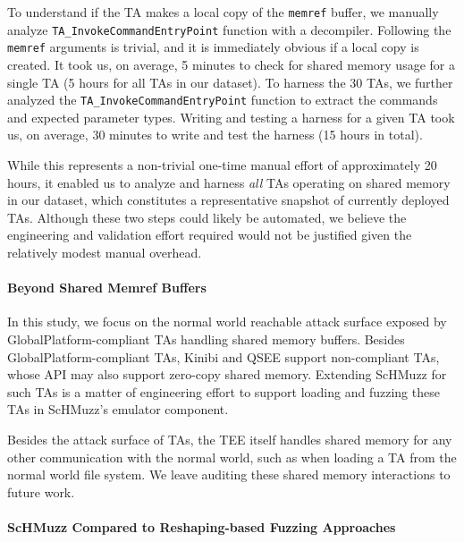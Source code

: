 \documentclass[conference]{IEEEtran}
\newcommand{\sysname}{ScHMuzz\xspace}
\newcommand{\kinibi}{Kinibi\xspace}
\newcommand{\qsee}{QSEE\xspace}
\newcommand{\numTAsharnessed}{30\xspace}
\begin{document}
To understand if the TA makes a local copy of the \texttt{memref} buffer, we manually analyze 
\texttt{TA\_InvokeCommandEntryPoint} function with a decompiler. Following the \texttt{memref} 
arguments is trivial, and it is immediately obvious if a local copy is created.
It took us, on average, 5 minutes to check for shared memory usage for a single TA (5 hours for all 
TAs in our dataset).
To harness the \numTAsharnessed TAs, we further analyzed the \texttt{TA\_InvokeCommandEntryPoint} function 
to extract the commands and expected parameter types. Writing and testing a harness 
for a given TA took us, on average, 30 minutes to write and test the harness (15 hours in total). 

While this represents a non-trivial one-time manual effort of approximately 20 hours, it enabled us to 
analyze and harness \emph{all} TAs operating on shared memory in our dataset, which constitutes a 
representative snapshot of currently deployed TAs. 
Although these two steps could likely be automated, we believe the engineering and validation effort required 
would not be justified given the relatively modest manual overhead.


\paragraph{Beyond Shared Memref Buffers}
In this study, we focus on the normal world reachable attack surface exposed by 
GlobalPlatform-compliant TAs handling shared memory buffers. 
Besides GlobalPlatform-compliant TAs, \kinibi and \qsee support non-compliant TAs, 
whose API may also support zero-copy shared memory. Extending 
\sysname for such TAs is a matter of engineering effort to support loading and 
fuzzing these TAs in \sysname's emulator component. 

Besides the attack surface of TAs, the TEE 
itself handles shared memory for any other communication with the normal world, 
such as when loading a TA from the normal world file system. We leave auditing 
these shared memory interactions to future work.

\paragraph{\sysname Compared to Reshaping-based Fuzzing Approaches}
\end{document}
